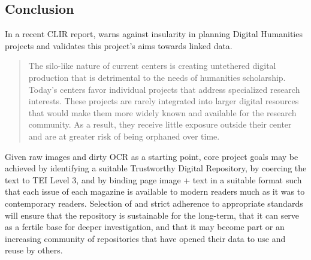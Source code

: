 \subsection{Conclusion}
In a recent CLIR report, warns against insularity in planning Digital Humanities projects and validates this project's aims towards linked data.
\begin{quote}The silo-like nature of current centers is creating untethered digital production that is detrimental to the needs of humanities scholarship. Today’s centers favor individual projects that address specialized research interests. These projects are rarely integrated into larger digital resources that would make them more widely known and available for the research community. As a result, they receive little exposure outside their center and are at greater risk of being orphaned over time.\cite{zorich}
\end{quote}
Given raw images and dirty OCR as a starting point, core project goals may be achieved by identifying a suitable Trustworthy Digital Repository, by coercing the text to TEI Level 3, and by binding page image + text in a suitable format such that each issue of each magazine is available to modern readers much as it was to contemporary readers. Selection of and strict adherence to appropriate standards will ensure that the repository is sustainable for the long-term, that it can serve as a fertile base for deeper investigation, and that it may become part or an increasing community of repositories that have opened their data to use and reuse by others. 





